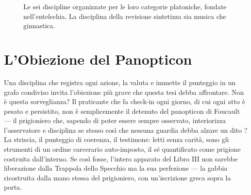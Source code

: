 \begin{figure}[ht]
\centering
{}
\caption{Le sei discipline organizzate per le loro categorie platoniche, fondate nell'entelechia. La disciplina della revisione sintetizza sia musica che ginnastica.\label{fig:discipline_italiano}}
\end{figure}

\section{L'Obiezione del Panopticon}

Una disciplina che registra ogni azione, la valuta e immette il punteggio in un
grafo condiviso invita l'obiezione pi\`u grave che questa tesi debba affrontare.
Non \`e questa sorveglianza? Il praticante che fa check-in ogni giorno, di cui
ogni atto \`e pesato e persistito, non \`e semplicemente il detenuto del
panopticon di Foucault --- il prigioniero che, sapendo di poter essere sempre
osservato, interiorizza l'osservatore e disciplina se stesso cos\`i che nessuna
guardia debba alzare un dito \parencite{foucault1977discipline}? La striscia, il
punteggio di coerenza, il testimone: letti senza carit\`a, sono gli strumenti di
un ordine carcerario auto-imposto, il s\'e quantificato come prigione costruita
dall'interno. Se cos\`i fosse, l'intero apparato del Libro III non sarebbe
liberazione dalla Trappola dello Specchio ma la sua perfezione --- la gabbia
ricostruita dalla mano stessa del prigioniero, con un'iscrizione greca sopra la
porta.

